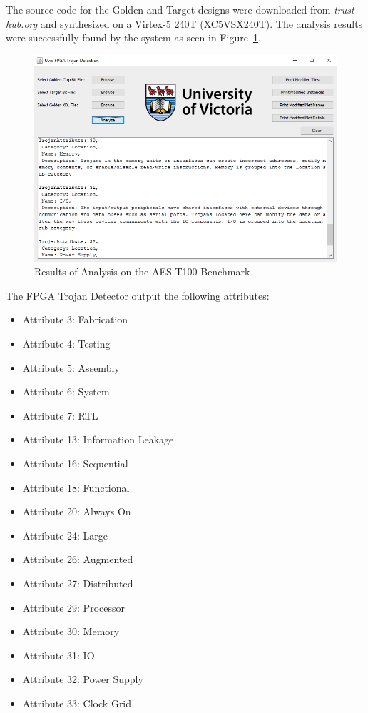 \documentclass[journal, hidelinks]{IEEEtran}
\begin{document}
The source code for the Golden and Target designs were downloaded from \textit{trust-hub.org} and synthesized on a Virtex-5 240T  (XC5VSX240T).
The analysis results were successfully found by the system as seen in Figure~\ref{fig:aesResult}.
\begin{figure}[h]
	\centering
	\includegraphics[width=1\linewidth]{Figures/aesResult}
	\caption[Results of Analysis on the AES-T100 Benchmark]{Results of Analysis on the AES-T100 Benchmark}
	\label{fig:aesResult}
\end{figure}

The FPGA Trojan Detector output the following attributes:
\begin{itemize}
	\item Attribute 3: Fabrication
	\item Attribute 4: Testing
	\item Attribute 5: Assembly
	\item Attribute 6: System
	\item Attribute 7: RTL
	\item Attribute 13: Information Leakage
	\item Attribute 16: Sequential
	\item Attribute 18: Functional
	\item Attribute 20: Always On
	\item Attribute 24: Large
	\item Attribute 26: Augmented
	\item Attribute 27: Distributed
	\item Attribute 29: Processor
	\item Attribute 30: Memory
	\item Attribute 31: IO
	\item Attribute 32: Power Supply
	\item Attribute 33: Clock Grid
\end{itemize}
\end{document}
